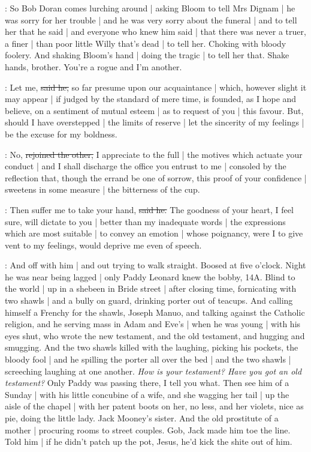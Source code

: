 \Nq:
So Bob Doran comes lurching around |
asking Bloom to tell Mrs Dignam |
he was sorry for her trouble |
and he was very sorry about the funeral |
and to tell her that he said |
and everyone who knew him said |
that there was never a truer,
a finer |
than poor little Willy that's dead |
to tell her.
Choking with bloody foolery.
And shaking Bloom's hand |
doing the tragic |
to tell her that.
Shake hands,
brother.
You're a rogue and I'm another.

\doran:
Let me,
\sout{said he,}
so far presume upon our acquaintance |
which,
however slight it may appear |
if judged by the standard of mere time,
is founded,
as I hope and believe,
on a sentiment of mutual esteem |
as to request of you |
this favour.
But,
should I have overstepped |
the limits of reserve |
let the sincerity of my feelings |
be the excuse for my boldness.

\Bloom:
No,
\sout{rejoined the other,}
I appreciate to the full |
the motives which actuate your conduct |
and I shall discharge the office you entrust to me |
consoled by the reflection that,
though the errand be one of sorrow,
this proof of your confidence |
sweetens in some measure |
the bitterness of the cup.

\doran:
Then suffer me to take your hand,
\sout{said he.}
The goodness of your heart,
I feel sure,
will dictate to you |
better than my inadequate words |
the expressions which are most suitable |
to convey an emotion |
whose poignancy,
were I to give vent to my feelings,
would deprive me even of speech.

\Nq:
And off with him |
and out trying to walk straight.
Boosed at five o'clock.
Night he was near being lagged |
only Paddy Leonard knew the bobby,
14A.
Blind to the world |
up in a shebeen in Bride street |
after closing time,
fornicating with two shawls |
and a bully on guard,
drinking porter out of teacups.
And calling himself a Frenchy for the shawls,
Joseph Manuo,
and talking against the Catholic religion,
and he serving mass in Adam and Eve's |
when he was young |
with his eyes shut,
who wrote the new testament,
and the old testament,
and hugging and smugging.
And the two shawls killed with the laughing,
picking his pockets,
the bloody fool |
and he spilling the porter all over the bed |
and the two shawls |
screeching laughing at one another.
\emph{How is your testament?
Have you got an old testament?}
Only Paddy was passing there,
I tell you what.
Then see him of a Sunday |
with his little concubine of a wife,
and she wagging her tail |
up the aisle of the chapel |
with her patent boots on her,
no less,
and her violets,
nice as pie,
doing the little lady.
Jack Mooney's sister.
And the old prostitute of a mother |
procuring rooms to street couples.
Gob,
Jack made him toe the line.
Told him |
if he didn't patch up the pot,
Jesus,
he'd kick the shite out of him.

